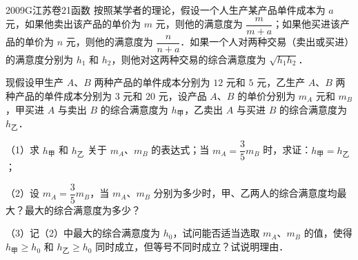 
\begin{problem}{2009}{G}{江苏卷}{21}{函数}
按照某学者的理论，假设一个人生产某产品单件成本为 $ a $ 元，如果他卖出该产品的单价为 $ m $ 元，则他的满意度为 $ \dfrac{m}{m+a} $；如果他买进该产品的单价为 $ n $ 元，则他的满意度为 $ \dfrac{n}{n+a} $．如果一个人对两种交易（卖出或买进）的满意度分别为 $ h_1 $ 和 $ h_2 $，则他对这两种交易的综合满意度为 $ \sqrt{h_1 h_2} $．

现假设甲生产 $ A $、$ B $ 两种产品的单件成本分别为 $ 12 $ 元和 $ 5 $ 元，乙生产 $ A $、$ B $ 两种产品的单件成本分别为 $ 3 $ 元和 $ 20 $ 元，设产品 $ A $、$ B $ 的单价分别为 $ m_A $ 元和 $ m_B $ ，甲买进 $ A $ 与卖出 $ B $ 的综合满意度为 $ h_{\text{甲}} $，乙卖出 $ A $ 与买进 $ B $ 的综合满意度为 $ h_{\text{乙}} $．

（1）求 $ h_{\text{甲}} $ 和 $ h_{\text{乙}} $ 关于 $ m_A $、$ m_B $ 的表达式；当 $ m_A = \dfrac{3}{5} m_B $ 时，求证：$ h_{\text{甲}} = h_{\text{乙}} $；

（2）设 $ m_A = \dfrac{3}{5} m_B $，当 $ m_A $、$ m_B $ 分别为多少时，甲、乙两人的综合满意度均最大？最大的综合满意度为多少？

（3）记（2）中最大的综合满意度为 $ h_0 $，试问能否适当选取 $ m_A $、$ m_B $ 的值，使得 $ h_{\text{甲}} \geq h_0 $ 和 $ h_{\text{乙}} \geq h_0 $ 同时成立，但等号不同时成立？试说明理由．
\end{problem}

\begin{answer}

\end{answer}

\begin{solutions}

\end{solutions}